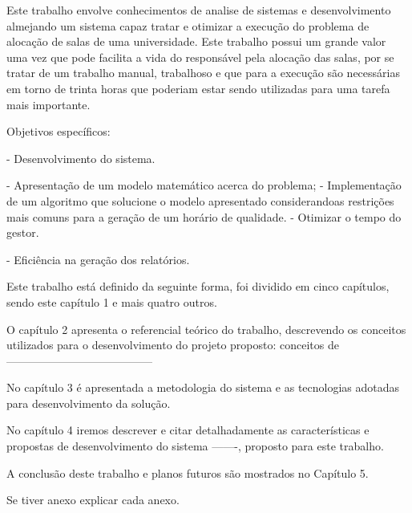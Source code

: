 	Este trabalho envolve conhecimentos de analise de sistemas e desenvolvimento almejando um sistema capaz tratar e otimizar a execução do problema de alocação de salas de uma universidade. Este trabalho possui um grande valor uma vez que pode facilita a vida do responsável pela alocação das salas, por se tratar de um trabalho manual, trabalhoso e que para a execução são necessárias em torno de trinta horas que poderiam estar sendo utilizadas para uma tarefa mais importante.\par


	Objetivos específicos:\par

	- Desenvolvimento do sistema.\par
	- Apresentação de um modelo matemático acerca do problema;
	- Implementação de um algoritmo que solucione o modelo apresentado considerandoas restrições mais comuns para a geração de um horário de qualidade.
	- Otimizar o tempo do gestor.\par
	- Eficiência na geração dos relatórios.\par



Este trabalho está definido da seguinte forma, foi dividido em cinco capítulos, sendo este capítulo 1 e mais quatro outros.\par

O capítulo 2 apresenta o referencial teórico do trabalho, descrevendo os conceitos utilizados para o desenvolvimento do projeto proposto: conceitos de ---------------------------------------\par

No capítulo 3 é apresentada a metodologia do sistema e as tecnologias adotadas para desenvolvimento da solução.\par

No capítulo 4 iremos descrever e citar detalhadamente as características e propostas de desenvolvimento do sistema -------, proposto para este trabalho.\par

A conclusão deste trabalho e planos futuros são mostrados no Capítulo 5.\par

Se tiver anexo explicar cada anexo.
